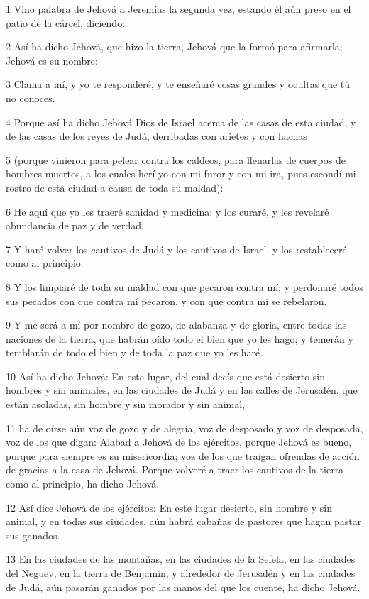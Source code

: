 \par 1 Vino palabra de Jehová a Jeremías la segunda vez, estando él aún preso en el patio de la cárcel, diciendo:
\par 2 Así ha dicho Jehová, que hizo la tierra, Jehová que la formó para afirmarla; Jehová es su nombre:
\par 3 Clama a mí, y yo te responderé, y te enseñaré cosas grandes y ocultas que tú no conoces.
\par 4 Porque así ha dicho Jehová Dios de Israel acerca de las casas de esta ciudad, y de las casas de los reyes de Judá, derribadas con arietes y con hachas
\par 5 (porque vinieron para pelear contra los caldeos, para llenarlas de cuerpos de hombres muertos, a los cuales herí yo con mi furor y con mi ira, pues escondí mi rostro de esta ciudad a causa de toda su maldad):
\par 6 He aquí que yo les traeré sanidad y medicina; y los curaré, y les revelaré abundancia de paz y de verdad.
\par 7 Y haré volver los cautivos de Judá y los cautivos de Israel, y los restableceré como al principio.
\par 8 Y los limpiaré de toda su maldad con que pecaron contra mí; y perdonaré todos sus pecados con que contra mí pecaron, y con que contra mí se rebelaron.
\par 9 Y me será a mí por nombre de gozo, de alabanza y de gloria, entre todas las naciones de la tierra, que habrán oído todo el bien que yo les hago; y temerán y temblarán de todo el bien y de toda la paz que yo les haré.
\par 10 Así ha dicho Jehová: En este lugar, del cual decís que está desierto sin hombres y sin animales, en las ciudades de Judá y en las calles de Jerusalén, que están asoladas, sin hombre y sin morador y sin animal,
\par 11 ha de oírse aún voz de gozo y de alegría, voz de desposado y voz de desposada, voz de los que digan: Alabad a Jehová de los ejércitos, porque Jehová es bueno, porque para siempre es su misericordia; voz de los que traigan ofrendas de acción de gracias a la casa de Jehová. Porque volveré a traer los cautivos de la tierra como al principio, ha dicho Jehová.
\par 12 Así dice Jehová de los ejércitos: En este lugar desierto, sin hombre y sin animal, y en todas sus ciudades, aún habrá cabañas de pastores que hagan pastar sus ganados.
\par 13 En las ciudades de las montañas, en las ciudades de la Sefela, en las ciudades del Neguev, en la tierra de Benjamín, y alrededor de Jerusalén y en las ciudades de Judá, aún pasarán ganados por las manos del que los cuente, ha dicho Jehová.
